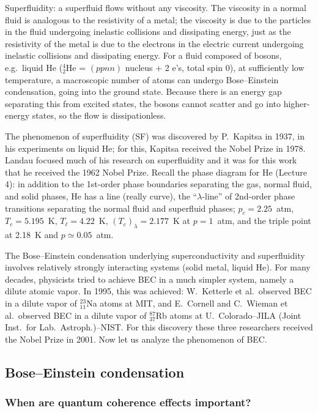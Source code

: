 Superfluidity: a superfluid flows without any viscosity. The viscosity in a normal fluid is analogous to the resistivity of a
metal; the viscosity is due to the particles in the fluid undergoing inelastic collisions and dissipating energy, just as the
resistivity of the metal is due to the electrons in the electric current undergoing inelastic collisions and dissipating energy.
For a fluid composed of bosons, e.g.\ liquid He ($^4_2$He = $(ppnn)$ nucleus $+$ 2 e's, total spin 0), at sufficiently low
temperature, a macroscopic number of atoms can undergo Bose--Einstein condensation, going into the ground state. Because there is
an energy gap separating this from excited states, the bosons cannot scatter and go into higher-energy states, so the flow is
dissipationless.

The phenomenon of superfluidity (SF) was discovered by P.~Kapitsa in 1937, in his experiments on liquid He; for this, Kapitsa
received the Nobel Prize in 1978. Landau focused much of his research on superfluidity and it was for this work that he
received the 1962 Nobel Prize. Recall the phase diagram for He (Lecture 4): in addition to the 1st-order phase boundaries
separating the gas, normal fluid, and solid phases, He has a line (really curve), the ``$\lambda$-line'' of 2nd-order phase
transitions separating the normal fluid and superfluid phases; $p_c = 2.25$~atm, $T_c = 5.195$~K, $T_\ell = 4.22$~K,
$(T_c)_\lambda = 2.177$~K at $p = 1$~atm, and the triple point at 2.18~K and $p\simeq 0.05$~atm.

The Bose--Einstein condensation underlying superconductivity and superfluidity involves relatively strongly interacting systems
(solid metal, liquid He). For many decades, physicists tried to achieve BEC in a much simpler system, namely a dilute atomic
vapor. In 1995, this was achieved: W.~Ketterle et al.\ observed BEC in a dilute vapor of $^{23}_{11}$Na atoms at MIT, and
E.~Cornell and C.~Wieman et al.\ observed BEC in a dilute vapor of $^{87}_{37}$Rb atoms at U.~Colorado--JILA (Joint Inst.\ for
Lab.\ Astroph.)--NIST. For this discovery these three researchers received the Nobel Prize in 2001. Now let us analyze the
phenomenon of BEC.

\subsection{Bose--Einstein condensation}
\subsubsection*{When are quantum coherence effects important?}

